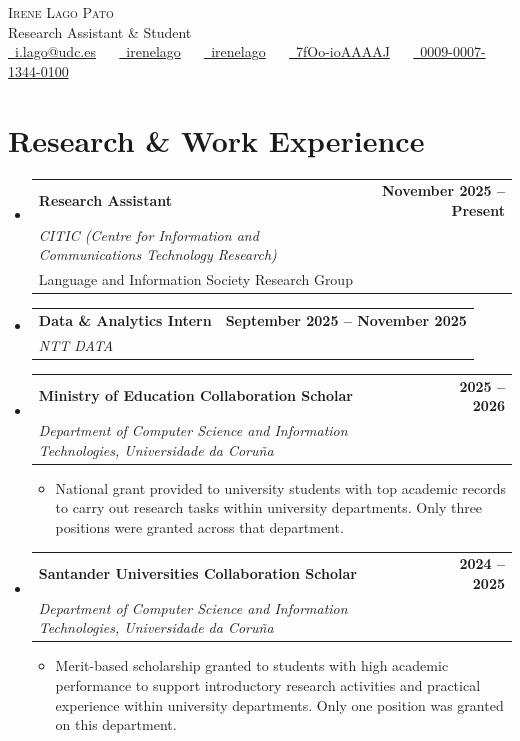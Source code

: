 \documentclass[letterpaper,11pt]{article}
\makeatletter
\newcommand{\resumeItem}[1]{
  \item\small{#1}
}
\newcommand{\resumeSubheading}[4]{
  \item
    \begin{tabular*}{0.97\textwidth}[t]{@{}p{0.72\textwidth}@{\extracolsep{\fill}}r@{}}
      \textbf{#1} & \textbf{\small #2} \\
      \textit{\small #3} & \textit{\small #4} \\
    \end{tabular*}
  \vspace{2pt}
}
\newcommand{\resumeSubheadingExtra}[5]{
  \item
    \begin{tabular*}{0.97\textwidth}[t]{@{}p{0.72\textwidth}@{\extracolsep{\fill}}r@{}}
      \textbf{#1} & \textbf{\small #2} \\
      \textit{\small #3} & \textit{\small #4} \\
      \small #5 & \\
    \end{tabular*}
  \vspace{2pt}
}
\newcommand{\resumeSubHeadingListStart}{\begin{itemize}[leftmargin=0.12in, label={}, itemsep=6pt, parsep=0pt, topsep=2pt]}
\newcommand{\resumeSubHeadingListEnd}{\end{itemize}}
\newcommand{\resumeItemListStart}{\begin{itemize}[leftmargin=0.15in, itemsep=2pt, parsep=0pt, topsep=2pt]}
\newcommand{\resumeItemListEnd}{\end{itemize}}
\makeatother
\begin{document}
\begin{center}
    {\Huge \scshape Irene Lago Pato} \\[4pt]
    {\large Research Assistant \& Student} \\[8pt]
    \small
    \href{mailto:i.lago@udc.es}{\faEnvelope\ i.lago@udc.es} ~~
    \href{https://www.linkedin.com/in/irenelago/}{\faLinkedin\ irenelago} ~~
    \href{https://github.com/irenelago}{\faGithub\ irenelago} ~~
    \href{https://scholar.google.es/citations?user=7fOo-ioAAAAJ&hl=es&oi=ao}{\faGraduationCap\ 7fOo-ioAAAAJ} ~~
    \href{https://orcid.org/0009-0007-1344-0100}{\faOrcid\ 0009-0007-1344-0100}
\end{center}

\vspace{2pt}

\section{Research \& Work Experience}
\resumeSubHeadingListStart

  \resumeSubheadingExtra
    {Research Assistant}{November 2025 -- Present}
    {CITIC (Centre for Information and Communications Technology Research)}{}
    {Language and Information Society Research Group}

  \resumeSubheading
    {Data \& Analytics Intern}{September 2025 -- November 2025}
    {NTT DATA}{}

  \resumeSubheading
    {Ministry of Education Collaboration Scholar}{2025 -- 2026}
    {Department of Computer Science and Information Technologies, Universidade da Coru\~{n}a}{}
    \resumeItemListStart
      \resumeItem{National grant provided to university students with top academic records to carry out research tasks within university departments. Only three positions were granted across that department.}
    \resumeItemListEnd

  \resumeSubheading
    {Santander Universities Collaboration Scholar}{2024 -- 2025}
    {Department of Computer Science and Information Technologies, Universidade da Coru\~{n}a}{}
    \resumeItemListStart
      \resumeItem{Merit-based scholarship granted to students with high academic performance to support introductory research activities and practical experience within university departments. Only one position was granted on this department.}
    \resumeItemListEnd

\resumeSubHeadingListEnd
\end{document}
